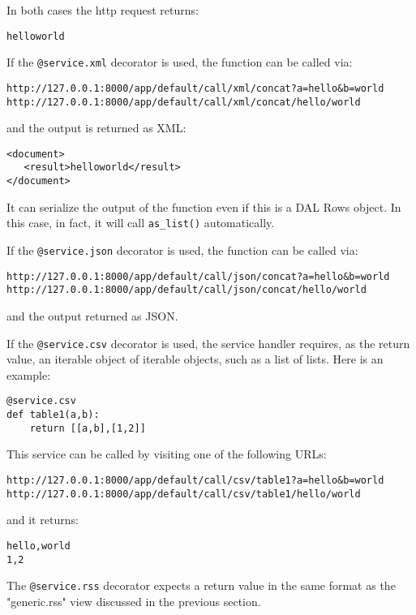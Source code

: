\documentclass[justified,sixbynine,notoc]{tufte-book}
\def\ft{\small\tt}
\begin{document}
\begin{fullwidth}
In both cases the http request returns:
\begin{lstlisting}
helloworld
\end{lstlisting}

If the {\ft @service.xml} decorator is used, the function can be called via:

\begin{lstlisting}[keywords={}]
http://127.0.0.1:8000/app/default/call/xml/concat?a=hello&b=world
http://127.0.0.1:8000/app/default/call/xml/concat/hello/world
\end{lstlisting}
\noindent and the output is returned as XML:
\begin{lstlisting}[keywords={}]
<document>
   <result>helloworld</result>
</document>
\end{lstlisting}

It can serialize the output of the function even if this is a DAL Rows object. In this case, in fact, it will call {\ft as\_list()} automatically.

If the {\ft @service.json} decorator is used, the function can be called via:

\begin{lstlisting}[keywords={}]
http://127.0.0.1:8000/app/default/call/json/concat?a=hello&b=world
http://127.0.0.1:8000/app/default/call/json/concat/hello/world
\end{lstlisting}
\noindent and the output returned as JSON.

If the {\ft @service.csv} decorator is used, the service handler requires, as the return value, an iterable object of iterable objects, such as a list of lists. Here is an example:
\begin{lstlisting}
@service.csv
def table1(a,b):
    return [[a,b],[1,2]]
\end{lstlisting}

This service can be called by visiting one of the following URLs:

\begin{lstlisting}[keywords={}]
http://127.0.0.1:8000/app/default/call/csv/table1?a=hello&b=world
http://127.0.0.1:8000/app/default/call/csv/table1/hello/world
\end{lstlisting}
\noindent and it returns:
\begin{lstlisting}
hello,world
1,2
\end{lstlisting}

The {\ft @service.rss} decorator expects a return value in the same format as the "generic.rss" view discussed in the previous section.


\end{fullwidth}
\end{document}
